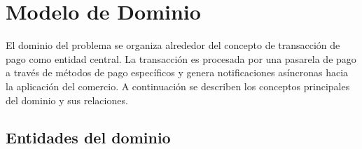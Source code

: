 \section{Modelo de Dominio}

El dominio del problema se organiza alrededor del concepto de transacción de pago como entidad central. La transacción es procesada por una pasarela de pago a través de métodos de pago específicos y genera notificaciones asíncronas hacia la aplicación del comercio. A continuación se describen los conceptos principales del dominio y sus relaciones.

\subsection{Entidades del dominio}

\renewcommand{\arraystretch}{1.2}

